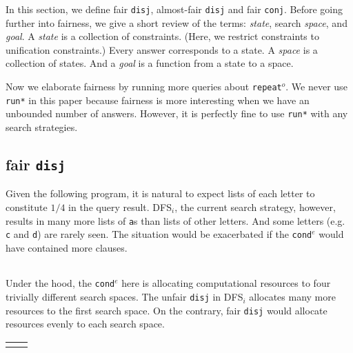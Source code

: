 \documentclass[format=acmlarge, review=true, authordraft=true]{acmart}
\newcommand{\conde}{\texttt{cond$^e$}}
\newcommand{\conj}{\texttt{conj}}
\newcommand{\disj}{\texttt{disj}}
\newcommand{\repeato}{\texttt{repeat$^o$}}
\newcommand{\DFSi }[0]{DFS$_{i}$}
\begin{document}
In this section, we define fair \disj{}, almost-fair \disj{} and fair \conj{}. 
Before going further into fairness, we give a short review of the terms:
\emph{state}, search \emph{space}, and \emph{goal}.
A \emph{state} is a collection of constraints. (Here, we restrict 
constraints to unification constraints.) Every answer corresponds to a 
state. A \emph{space} is a collection of states. And a \emph{goal} is a 
function from a state to a space.


Now we elaborate fairness by running more queries about \repeato{}. We never 
use \texttt{run*} in this paper because fairness is more interesting when we 
have an unbounded number of answers. However, it is perfectly fine to use 
\texttt{run*} with any search strategies.

\subsection{fair \texttt{disj}}

Given the following program, it is natural to expect lists of each letter to
constitute $1/4$ in the query result. \DFSi, the current search
strategy, however, results in many more lists of \texttt{a}s than lists
of other letters. And some letters  (e.g. \texttt{c} and \texttt{d}) are
rarely seen. The situation would be exacerbated if the \conde{} would have
contained more clauses.

\begin{center}
	\begin{tabular}{c}
		
	\end{tabular}
\end{center}

Under the hood, the \conde{} here is allocating computational resources to 
four trivially different search spaces. The unfair \disj{} in 
\DFSi{} allocates many more resources to the first search space. On the 
contrary, fair \disj{} would allocate resources evenly to each search space. 

\begin{center}
	\begin{tabular}{l|r}
		 &
		
	\end{tabular}
\end{center}
\end{document}
